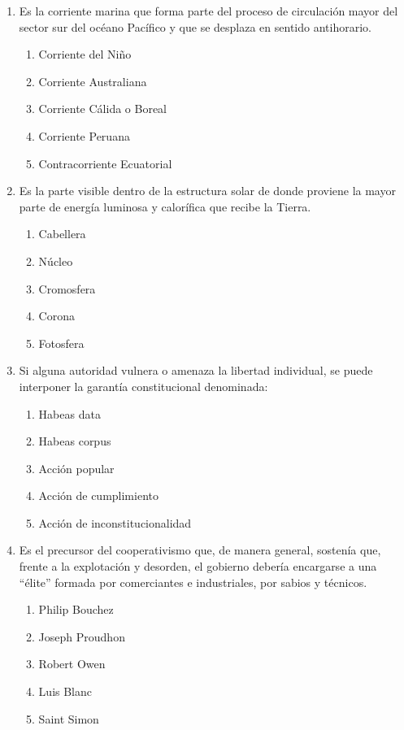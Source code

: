 \begin{enumerate}
	\item Es la corriente marina que forma parte del proceso de circulación mayor del sector sur del océano Pacífico y que se desplaza en sentido antihorario.
	\begin{enumerate}[label=\alph*)]
		\item Corriente del Niño
		\item Corriente Australiana
		\item Corriente Cálida o Boreal
		\item Corriente Peruana
		\item Contracorriente Ecuatorial
	\end{enumerate}
	
	\item Es la parte visible dentro de la estructura solar de donde proviene la mayor parte de energía luminosa y calorífica que recibe la Tierra.
	\begin{enumerate}[label=\alph*)]
		\item Cabellera
		\item Núcleo
		\item Cromosfera
		\item Corona
		\item Fotosfera
	\end{enumerate}
	
	\item Si alguna autoridad vulnera o amenaza la libertad individual, se puede interponer la garantía constitucional denominada:
	\begin{enumerate}[label=\alph*)]
		\item Habeas data
		\item Habeas corpus
		\item Acción popular
		\item Acción de cumplimiento
		\item Acción de inconstitucionalidad
	\end{enumerate}
	
	\item Es el precursor del cooperativismo que, de manera general, sostenía que, frente a la explotación y desorden, el gobierno debería encargarse a una “élite” formada por comerciantes e industriales, por sabios y técnicos.
	\begin{enumerate}[label=\alph*)]
		\item Philip Bouchez
		\item Joseph Proudhon
		\item Robert Owen
		\item Luis Blanc
		\item Saint Simon
	\end{enumerate}
	

\end{enumerate}
